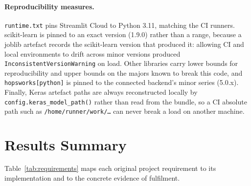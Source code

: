 \documentclass[11pt,a4paper]{article}
\begin{document}
\paragraph{Reproducibility measures.}
\texttt{runtime.txt} pins Streamlit Cloud to Python 3.11, matching the CI
runners. scikit-learn is pinned to an exact version (1.9.0) rather than a
range, because a joblib artefact records the scikit-learn version that produced
it: allowing CI and local environments to drift across minor versions produced
\texttt{InconsistentVersionWarning} on load. Other libraries carry lower bounds
for reproducibility and upper bounds on the majors known to break this code,
and \texttt{hopsworks[python]} is pinned to the connected backend's minor
series (5.0.x). Finally, Keras artefact paths are always reconstructed locally
by \texttt{config.keras\_model\_path()} rather than read from the bundle, so a
CI absolute path such as \texttt{/home/runner/work/\ldots} can never break a
load on another machine.

\section{Results Summary}

Table~\ref{tab:requirements} maps each original project requirement to its
implementation and to the concrete evidence of fulfilment.
\end{document}
